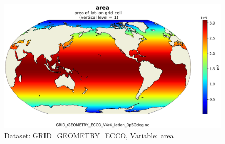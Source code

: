 \begin{figure}[H]
\centering
\includegraphics[scale=0.55]{../images/v4r4/plots/latlon_plots_coords/Geometry_Parameters_for_the_0.5_degree_Lat-Lon_Model_Grid_(Version_4_Release_4)/area.png}
\caption{Dataset: GRID\_GEOMETRY\_ECCO, Variable: area}
\label{tab:table-GRID_GEOMETRY_ECCO_area-Plot}
\end{figure}
\newpage
\pagebreak
